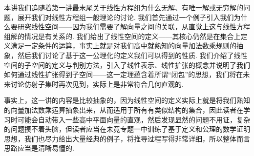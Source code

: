 \begin{summary}

    本讲我们追随着第一讲最末尾关于线性方程组为什么无解、有唯一解或无穷解的问题，展开我们对线性方程组一般理论的讨论. 我们首先通过一个例子引入我们为什么要研究线性空间——因为我们需要了解向量之间的关联，从直觉上这与线性方程组解的情况是有关系的. 我们给出了线性空间的定义——其核心仍然是在集合上定义满足一定条件的运算，事实上就是对我们高中就熟知的向量加法数乘规则的抽象，然后我们讨论了基于这一公理化的定义我们可以得到的性质. 我们介绍了线性空间的子空间的定义与判别方法，引入了线性表示、线性扩张的概念并说明了我们如何通过线性扩张得到子空间——这一定理蕴含着所谓``闭包''的思想，我们将在未来讨论仿射子集时再次见到，实际上是非常符合几何直观的.

    事实上，这一讲的内容是比较抽象的，因为线性空间的定义实际上就是将我们熟知的向量加法数乘运算抽象出来，从而适用于所有有类似结构的集合，因此读者在学习时可能会自动带入一些高中平面向量的直观，然后发现显然的问题不用证，复杂的问题摸不着头脑，但读者应当在未竟专题一中训练了基于定义和公理的数学证明思想，我们也尽力给出大量经典的例子，将推导过程写得非常详细，所以整体而言思路应当是清晰易懂的.

\end{summary}

